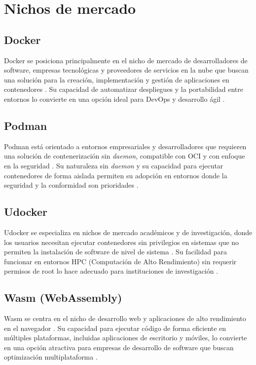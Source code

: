\section{Nichos de mercado}

\subsection{Docker}
Docker se posiciona principalmente en el nicho de mercado de desarrolladores de software, empresas tecnológicas y proveedores de servicios en la nube que buscan una solución para la creación, implementación y gestión de aplicaciones en contenedores \citep{Hill2025}. Su capacidad de automatizar despliegues y la portabilidad entre entornos lo convierte en una opción ideal para DevOps y desarrollo ágil \citep{Mag2025}.

\subsection{Podman}
Podman está orientado a entornos empresariales y desarrolladores que requieren una solución de contenerización sin \textit{daemon}, compatible con OCI y con enfoque en la seguridad \citep{Surendhar2024}. Su naturaleza sin \textit{daemon} y su capacidad para ejecutar contenedores de forma aislada permiten su adopción en entornos donde la seguridad y la conformidad son prioridades \citep{Trevor2022}.

\subsection{Udocker}
Udocker se especializa en nichos de mercado académicos y de investigación, donde los usuarios necesitan ejecutar contenedores sin privilegios en sistemas que no permiten la instalación de software de nivel de sistema \citep{Campos2017}. Su facilidad para funcionar en entornos HPC (Computación de Alto Rendimiento) sin requerir permisos de root lo hace adecuado para instituciones de investigación \citep{Gomes2018}.

\subsection{Wasm (WebAssembly)}
Wasm se centra en el nicho de desarrollo web y aplicaciones de alto rendimiento en el navegador \citep{Haas2017}. Su capacidad para ejecutar código de forma eficiente en múltiples plataformas, incluidas aplicaciones de escritorio y móviles, lo convierte en una opción atractiva para empresas de desarrollo de software que buscan optimización multiplataforma \citep{Jangda2019}.

